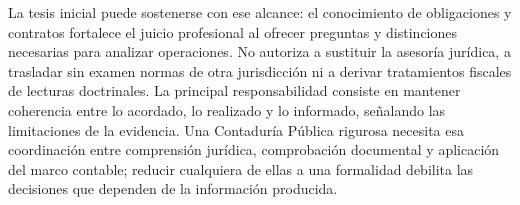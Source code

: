 {La tesis inicial puede sostenerse con ese alcance: el conocimiento de obligaciones y contratos fortalece el juicio profesional al ofrecer preguntas y distinciones necesarias para analizar operaciones. No autoriza a sustituir la asesoría jurídica, a trasladar sin examen normas de otra jurisdicción ni a derivar tratamientos fiscales de lecturas doctrinales. La principal responsabilidad consiste en mantener coherencia entre lo acordado, lo realizado y lo informado, señalando las limitaciones de la evidencia. Una Contaduría Pública rigurosa necesita esa coordinación entre comprensión jurídica, comprobación documental y aplicación del marco contable; reducir cualquiera de ellas a una formalidad debilita las decisiones que dependen de la información producida.

\clearpage
}
